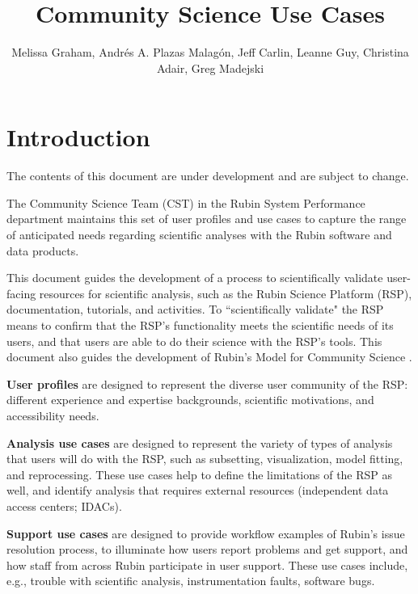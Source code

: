 \documentclass[DM,lsstdraft,authoryear,toc]{lsstdoc}
\title{Community Science Use Cases}
\author{%
Melissa Graham, Andrés A. Plazas Malagón, Jeff Carlin, Leanne Guy, Christina Adair, Greg Madejski
}
\date{\vcsDate}
\begin{document}
\maketitle


\section{Introduction}

The contents of this document are under development and are subject to change.

The Community Science Team (CST) in the Rubin System Performance department maintains this set of user profiles and use cases
to capture the range of anticipated needs regarding scientific analyses with the Rubin software and data products.

This document guides the development of a process to scientifically validate user-facing resources for scientific analysis,
such as the Rubin Science Platform (RSP), documentation, tutorials, and activities.
To ``scientifically validate" the RSP means to confirm that the RSP's functionality meets the scientific needs
of its users, and that users are able to do their science with the RSP's tools.
This document also guides the development of Rubin's Model for Community Science .

\textbf{User profiles} are designed to represent the diverse user community of the RSP:
different experience and expertise backgrounds, scientific motivations, and accessibility needs.

\textbf{Analysis use cases} are designed to represent the variety of types of analysis that
users will do with the RSP, such as subsetting, visualization, model fitting, and reprocessing.
These use cases help to define the limitations of the RSP as well, and identify analysis
that requires external resources (independent data access centers; IDACs).

\textbf{Support use cases} are designed to provide workflow examples of Rubin's issue resolution
process, to illuminate how users report problems and get support, and how staff from across
Rubin participate in user support.
These use cases include, e.g., trouble with scientific analysis,
instrumentation faults, software bugs.
\end{document}
